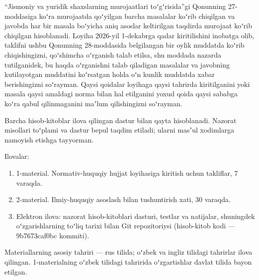 \documentclass[14pt,a4paper]{extarticle}
\begin{document}
“Jismoniy va yuridik shaxslarning murojaatlari toʻgʻrisida”gi Qonunning 27-moddasiga koʻra murojaatda qoʻyilgan barcha masalalar koʻrib chiqilgan va javobda har bir masala boʻyicha aniq asoslar keltirilgan taqdirda murojaat koʻrib chiqilgan hisoblanadi. Loyiha 2026-yil 1-dekabrga qadar kiritilishini inobatga olib, taklifni ushbu Qonunning 28-moddasida belgilangan bir oylik muddatda koʻrib chiqishingizni, qoʻshimcha oʻrganish talab etilsa, shu moddada nazarda tutilganidek, bu haqda oʻrganishni talab qiladigan masalalar va javobning kutilayotgan muddatini koʻrsatgan holda oʻn kunlik muddatda xabar berishingizni soʻrayman. Qaysi qoidalar loyihaga qaysi tahrirda kiritilganini yoki masala qaysi amaldagi norma bilan hal etilganini yoxud qoida qaysi sababga koʻra qabul qilinmaganini maʼlum qilishingizni soʻrayman.

Barcha hisob-kitoblar ilova qilingan dastur bilan qayta hisoblanadi. Nazorat misollari toʻplami va dastur bepul taqdim etiladi; ularni masʼul xodimlarga namoyish etishga tayyorman.

\noindent Ilovalar:
\begin{enumerate}[leftmargin=1.27cm,label=\arabic*.]
\item 1-material. Normativ-huquqiy hujjat loyihasiga kiritish uchun takliflar, 7 varaqda.
\item 2-material. Ilmiy-huquqiy asoslash bilan tushuntirish xati, 30 varaqda.
\item Elektron ilova: nazorat hisob-kitoblari dasturi, testlar va natijalar, shuningdek oʻzgarishlarning toʻliq tarixi bilan Git repozitoriysi (hisob-kitob kodi — 9b7673caf0bc kommiti).
\end{enumerate}
Materiallarning asosiy tahriri — rus tilida; oʻzbek va ingliz tilidagi tahrirlar ilova qilingan. 1-materialning oʻzbek tilidagi tahririda oʻzgartishlar davlat tilida bayon etilgan.
\end{document}
